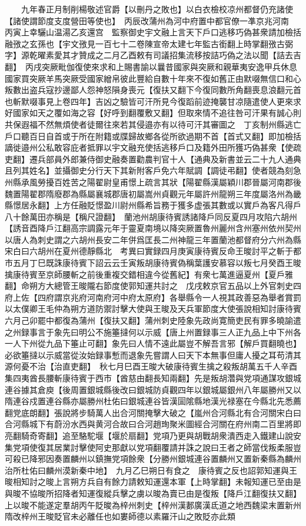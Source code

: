 　　九年春正月制削楊敬述官爵【以刪丹之敗也】以白衣檢校凉州都督仍充諸使【諸使謂節度支度營田等使也】　丙辰改蒲州為河中府置中都官僚一凖京兆河南　丙寅上幸驪山温湯乙亥還宫　監察御史宇文融上言天下戶口逃移巧偽甚衆請加檢括融㢸之玄孫也【宇文㢸見一百七十二卷陳宣帝太建七年監古銜翻上時掌翻㢸古弼字】源乾曜素愛其才贊成之二月乙酉敕有司議招集流移按詰巧偽之法以聞【詰去吉翻】　丙戌突厥毗伽復使來求和上賜書諭以曩昔國家與突厥和親華夷安逸甲兵休息國家買突厥羊馬突厥受國家繒帛彼此豐給自數十年來不復如舊正由默啜無信口和心叛數出盗兵寇抄邊鄙人怨神怒隕身喪元【復扶又翻下今復同數所角翻喪息浪翻元首也斬默啜事見上卷四年】吉凶之驗皆可汗所見今復蹈前迹掩襲甘凉隨遣使人更來求好國家如天之覆如海之容【好呼到翻覆敷又翻】但取來情不追往咎可汗果有誠心則共保遐福不然無煩使者徒爾往來若其侵邉亦有以待可汗其審圖之　丁亥制州縣逃亡戶口聽百日自首或于所在附籍或牒歸故鄉各從所欲過期不首【首式又翻】即加檢括謫徙邉州公私敢容庇者抵罪以宇文融充使括逃移戶口及籍外田所獲巧偽甚衆【使疏吏翻】遷兵部員外郎兼侍御史融奏置勸農判官十人【通典及新書並云二十九人通典且列其姓名】並攝御史分行天下其新附客戶免六年賦調【調徒弔翻】使者競為刻急州縣承風勞擾百姓苦之陽翟尉皇甫憬上疏言其狀【陽翟縣漢屬穎川郡晉屬河南郡後魏置陽翟郡隋廢郡為縣屬襄城郡唐初屬嵩州貞觀元年屬許州龍朔三年度屬洛州為畿縣憬居永翻】上方任融貶憬盈川尉州縣希旨務于獲多虚張其數或以實戶為客凡得戶八十餘萬田亦稱是【稱尺證翻】　蘭池州胡康待賓誘諸降戶同反夏四月攻陷六胡州【誘音酉降戶江翻高宗調露元年于靈夏南境以降突厥置魯州麗州含州塞州依州契州以唐人為刺史謂之六胡州長安二年併爲匡長二州神龍三年置蘭池都督府分六州為縣宋白曰六胡州在夏州德靜縣北　考異曰實録四月庚寅康待賓反命王晙討平之斬于都市五月丁巳既誅康待賓下詔云云壬寅叛胡康待賓偽稱葉護安慕容以叛七月癸酉王晙擒康待賓至京師腰斬之前後重複交錯相違今從舊紀】有衆七萬進逼夏州【夏戶雅翻】命朔方大總管王晙隴右節度使郭知運共討之　戊戌敕京官五品以上外官刺史四府上佐【四府謂京兆府河南府河中府太原府】各舉縣令一人視其政善惡為舉者賞罰　以太僕卿王毛仲為朔方道防禦討擊大使與王晙及天兵軍節度大使張說相知討康待賓　六月己卯罷中都復為蒲州【復扶又翻】蒲州刺史陸象先政尚寛簡吏民有罪多曉諭遣之州録事言于象先曰明公不施箠撻何以示威【唐上州置録事三人正九品上中下州各一人下州從九品下箠止可翻】象先曰人情不遠此屬豈不解吾言邪【解戶買翻曉也】必欲箠撻以示威當從汝始録事慙而退象先嘗謂人曰天下本無事但庸人擾之耳苟清其源何憂不治【治直吏翻】　秋七月巳酉王晙大破康待賓生擒之殺叛胡萬五千人辛酉集四夷酋長腰斬康待賓于西市【酋慈由翻長知兩翻】先是叛胡濳與党項通謀攻銀城連谷據其倉庾【後周置銀城縣後改曰銀城防貞觀四年以銀城屬銀州八年屬勝州又以隋連谷戍置連谷縣亦屬勝州杜佑曰銀城連谷皆漢圁隂縣地漢光禄塞在今縣北先悉薦翻党底朗翻】張說將步騎萬人出合河關掩擊大破之【嵐州合河縣北有合河關宋白曰合河縣城下有蔚汾水西與黄河合故曰合河趙珣聚米圖經合河關在府州南二百里將即亮翻騎奇寄翻】追至駱駝堰【堰於扇翻】党項乃更與胡戰胡衆潰西走入鐵建山說安集党項使復其居業討擊使阿史那獻以党項翻覆請并誅之說曰王者之師當伐叛柔服豈可殺已降邪因奏置麟州以鎮撫党項餘衆【分勝州銀城連谷置麟州又置新秦縣為麟州治所杜佑曰麟州漠新秦中地】　九月乙巳朔日有食之　康待賓之反也詔郭知運與王晙相知討之晙上言朔方兵自有餘力請敕知運還本軍【上時掌翻】未報知運已至由是與晙不協晙所招降者知運復縱兵擊之虜以晙為賣已由是復叛【降戶江翻復扶又翻】上以晙不能遂定羣胡丙午貶晙為梓州刺史【梓州漢郪廣漢氐道之地西魏梁末置新州隋改梓州王晙貶官未必離任也如婁師德以素羅汗山之敗貶亦此類